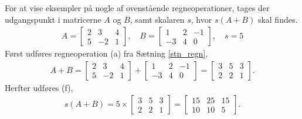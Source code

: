 \begin{eks}
For at vise eksempler på nogle af ovenstående regneoperationer, tages der udgangspunkt i matricerne $A$ og $B$, samt skalaren $s$, hvor $s(A+B)$ skal findes.
\begin{align*}
A= \begin{bmatrix}
	2 & 3 & 4 \\
	5 & -2 & 1 	
\end{bmatrix}, \quad
B= \begin{bmatrix}
	1 & 2 & -1 \\
	-3 & 4 & 0
\end{bmatrix}, \quad
s=5
\end{align*}
Først udføres regneoperation (a) fra Sætning \ref{stn_regn},
\begin{align*}
A+B= \begin{bmatrix}
	2 & 3 & 4 \\
	5 & -2 & 1 	
\end{bmatrix}  
+ \begin{bmatrix}
	1 & 2 & -1 \\
	-3 & 4 & 0
\end{bmatrix}
= \begin{bmatrix}
	3 & 5 & 3 \\
	2 & 2 & 1
\end{bmatrix}.
\end{align*}
Herfter udføres (f),
\begin{align*}
s(A+B)= 5 \times \begin{bmatrix}
	3 & 5 & 3 \\
	2 & 2 & 1
\end{bmatrix}
= \begin{bmatrix}
	15 & 25 & 15 \\
	10 & 10 & 5
\end{bmatrix}.
\end{align*}
\end{eks}


